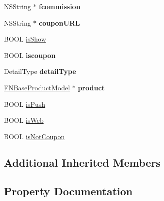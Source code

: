 \begin{DoxyCompactItemize}
N\+S\+String $\ast$ {\bfseries fcommission}
\item 
\mbox{\label{interface_a_l_b_b_custom_web_view_controller_a36cc7d4659509627e923103c04c63d9b}} 
N\+S\+String $\ast$ {\bfseries coupon\+U\+RL}
\item 
B\+O\+OL \mbox{\hyperlink{interface_a_l_b_b_custom_web_view_controller_a02acc3306e3e2878ca8e7b168704d5dc}{is\+Show}}
\item 
\mbox{\label{interface_a_l_b_b_custom_web_view_controller_a104e401224da02aa90f993a017c07988}} 
B\+O\+OL {\bfseries iscoupon}
\item 
\mbox{\label{interface_a_l_b_b_custom_web_view_controller_ac7558e8eeb527b7a076bc7253b43802d}} 
Detail\+Type {\bfseries detail\+Type}
\item 
\mbox{\label{interface_a_l_b_b_custom_web_view_controller_afd7f68da14eb801e5d91e3fc11a276f7}} 
\mbox{\hyperlink{interface_f_n_base_product_model}{F\+N\+Base\+Product\+Model}} $\ast$ {\bfseries product}
\item 
B\+O\+OL \mbox{\hyperlink{interface_a_l_b_b_custom_web_view_controller_a950eeb6d6f7655ec55471b6269f463eb}{is\+Push}}
\item 
B\+O\+OL \mbox{\hyperlink{interface_a_l_b_b_custom_web_view_controller_abcb32fc70cd153b5dbbc133346514b72}{is\+Web}}
\item 
B\+O\+OL \mbox{\hyperlink{interface_a_l_b_b_custom_web_view_controller_a36d152d80f7ae0513abf40c50a47a9a2}{is\+Not\+Coupon}}
\end{DoxyCompactItemize}
\subsection*{Additional Inherited Members}


\subsection{Property Documentation}
\mbox{\label{interface_a_l_b_b_custom_web_view_controller_a33abd4ed992cb9c0ad06bc434c40dd41}} 

